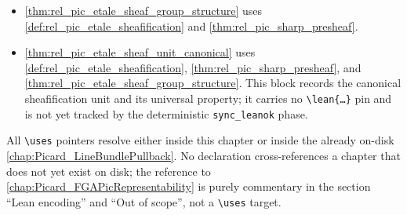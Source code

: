 \begin{itemize}
    no longer consumed by the FGA chapter).
  \item \cref{thm:rel_pic_etale_sheaf_group_structure} uses
    \cref{def:rel_pic_etale_sheafification} and \cref{thm:rel_pic_sharp_presheaf}.
  \item \cref{thm:rel_pic_etale_sheaf_unit_canonical} uses
    \cref{def:rel_pic_etale_sheafification}, \cref{thm:rel_pic_sharp_presheaf}, and
    \cref{thm:rel_pic_etale_sheaf_group_structure}. This block records the
    canonical sheafification unit and its universal property; it carries
    no \texttt{\textbackslash lean\{\dots\}} pin and is not yet tracked
    by the deterministic \texttt{sync\_leanok} phase.
\end{itemize}
All \texttt{\textbackslash uses} pointers resolve either inside this chapter or inside the already
on-disk \cref{chap:Picard_LineBundlePullback}. No declaration cross-references
a chapter that does not yet exist on disk; the reference to
\cref{chap:Picard_FGAPicRepresentability} is purely commentary in the section
``Lean encoding'' and ``Out of scope'', not a \texttt{\textbackslash uses} target.
